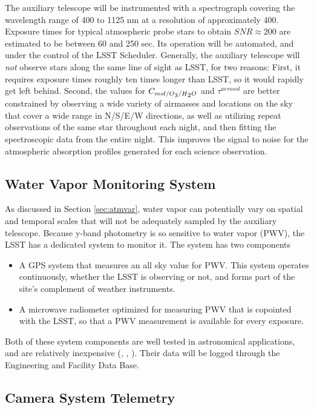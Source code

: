 \documentclass[12pt,preprint]{aastex}
\newcommand{\water}   {H\textsubscript{2}O}
\newcommand{\ozone}    {O\textsubscript{3}}
\begin{document}
The auxiliary telescope will be instrumented with a spectrograph covering the wavelength range of 400 to 1125 nm at
a resolution of approximately 400.  Exposure times for typical atmospheric probe stars to 
obtain $SNR \approx 200$ are estimated to be between 60 and 250 sec.
Its operation will be automated, and under the control of the LSST Scheduler.
Generally, the auxiliary telescope will {\it not} observe stars along the
same line of sight as LSST, for two reasons:  First, it requires exposure times roughly
ten times longer than LSST, so it would rapidly get left behind.  Second, the values for
$C_{mol/\ozone/\water}$ and $\tau^{aerosol}$ are better
constrained by observing a wide variety of airmasses and locations on
the sky that cover a wide range in N/S/E/W directions, as well as utilizing
repeat observations of the same star throughout each night, and then
fitting the spectroscopic data from the entire night. This improves the 
signal to noise for the atmospheric absorption profiles generated for each science observation.





\subsection{Water Vapor Monitoring System}

As discussed in Section \ref{sec:atmvar}, water vapor can potentially vary on spatial and temporal scales that will
not be adequately sampled by the auxiliary telescope.   Because y-band photometry is so sensitive to water vapor
(PWV), the LSST has a dedicated system to monitor it.  The system has two components
\begin{itemize}
\item A GPS system that measures an all sky value for PWV.  This system operates continuously, whether the LSST is
observing or not, and forms part of the site's complement of weather instruments.
\item A microwave radiometer optimized for measuring PWV that is copointed with the LSST, so that a PWV measurement
is available for every exposure.
\end{itemize}
Both of these system components are well tested in astronomical applications, and are relatively inexpensive
(\cite{Blake2011}, \cite{Radomski2010}, \cite{Gaffard2003}).  Their data will be logged through the Engineering and Facility Data Base. 

\subsection{Camera System Telemetry}
\end{document}

